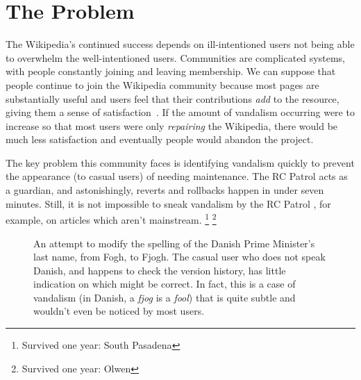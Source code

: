 \section{The Problem}

The Wikipedia's continued success depends on ill-intentioned users
not being able to overwhelm the well-intentioned users.
Communities are complicated systems, with people constantly joining and
leaving membership.
We can suppose that people continue to
join the Wikipedia community because most pages are
substantially useful and users feel that their contributions
\textit{add} to the resource,
giving them a sense of satisfaction~\cite{Benkler2002}.
If the amount of vandalism occurring were to increase so that
most users were only \textit{repairing} the Wikipedia, there
would be much less satisfaction and eventually people would
abandon the project.

The key problem this community faces is identifying vandalism
quickly to prevent the appearance (to casual users)
 of needing maintenance.
The RC Patrol acts as a guardian, and astonishingly, reverts and
rollbacks happen in under seven minutes.
Still, it is not impossible to sneak vandalism by the
RC Patrol ,
for example, on articles which aren't
mainstream.
\footnote{Survived one year: South Pasadena}
\footnote{Survived one year: Olwen}



\begin{figure}[t]
\centering
{}
\hspace{1ex}
\caption{An attempt to modify the
  spelling of the Danish Prime Minister's last name, from Fogh, to Fjogh.
  The casual user who does not speak Danish, and happens to check
  the version history, has little indication on which might be correct.
  In fact, this is a case of vandalism
  (in Danish, a \textit{fjog} is a \textit{fool})
  that is quite subtle and wouldn't even be noticed by most users.}
\label{fig-denmark}
\end{figure}


